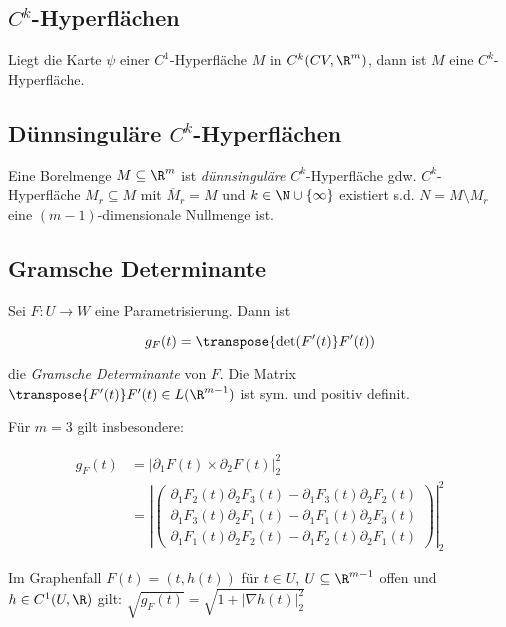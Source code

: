 \subsection*{$C^k$-Hyperflächen}

Liegt die Karte $\psi$ einer $C^1$-Hyperfläche $M$ in $C^k(CV,\R^m)$, dann ist $M$ eine $C^k$-Hyperfläche.

\subsection*{Dünnsinguläre $C^k$-Hyperflächen}

Eine Borelmenge $M \subseteq \R^m$ ist \emph{dünnsinguläre} $C^k$-Hyperfläche gdw. $C^k$-Hyperfläche $M_r \subseteq M$ mit $\overline M_r = M$ und $k \in \N \cup \{\infty\}$ existiert s.d. $N = M \setminus M_r$ eine $(m-1)$-dimensionale Nullmenge ist.

\subsection*{Gramsche Determinante}

Sei $F : U \to W$ eine Parametrisierung. Dann ist

\vspace{-2mm}
$$g_F(t) = \transpose{\det(F'(t)}F'(t))$$

die \emph{Gramsche Determinante} von $F$. Die Matrix $\transpose{F'(t)}F'(t) \in L(\R^{m-1})$ ist sym. und positiv definit.

\spacing

Für $m = 3$ gilt insbesondere:

\vspace{-4mm}
\begin{align*}
g_F(t) &= |\partial_1F(t) \times \partial_2F(t)|_2^2\\
       &= \left|\begin{pmatrix}
	\partial_1 F_2(t) \partial_2 F_3(t) - \partial_1 F_3(t) \partial_2 F_2(t) \\
	\partial_1 F_3(t) \partial_2 F_1(t) - \partial_1 F_1(t) \partial_2 F_3(t) \\
	\partial_1 F_1(t) \partial_2 F_2(t) - \partial_1 F_2(t) \partial_2 F_1(t)
\end{pmatrix}\right|_2^2
\end{align*}

Im Graphenfall $F(t) = (t,h(t))$ für $t \in U$, $U \subseteq \R^{m-1}$ offen und $h \in C^1(U,\R)$ gilt: $\sqrt{g_F(t)} = \sqrt{1+|\nabla h(t)|_2^2}$

